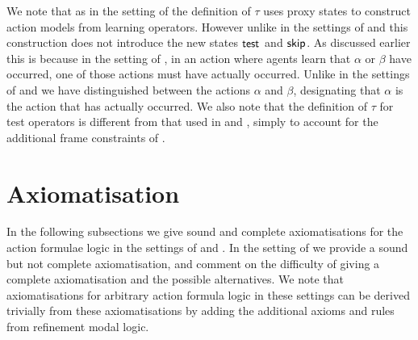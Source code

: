 We note that as in the setting of \classKFF{} the definition of $\tau$ uses proxy states to construct action models from learning operators.
However unlike in the settings of \classK{} and \classKFF{} this construction does not introduce the new states $\aStateTest$ and $\aStateSkip$.
As discussed earlier this is because in the setting of \classS{}, in an action where agents learn that $\alpha$ or $\beta$ have occurred, one of those actions must have actually occurred.
Unlike in the settings of \classK{} and \classKFF{} we have distinguished between the actions $\alpha$ and $\beta$, designating that $\alpha$ is the action that has actually occurred.
We also note that the definition of $\tau$ for test operators is different from that used in \classK{} and \classKFF{}, simply to account for the additional frame constraints of \classS{}.

\section{Axiomatisation}\label{axiomatisation}

In the following subsections we give sound and complete axiomatisations for the action formulae logic in the settings of \classK{} and \classKFF{}.
In the setting of \classS{} we provide a sound but not complete axiomatisation, and comment on the difficulty of giving a complete axiomatisation and the possible alternatives.
We note that axiomatisations for arbitrary action formula logic in these settings can be derived trivially from these axiomatisations by adding the additional axioms and rules from refinement modal logic.

\subsection{\classK{}}

